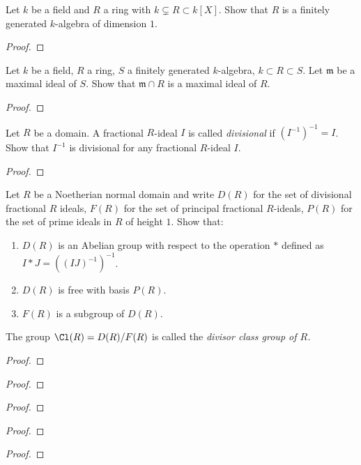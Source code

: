 \begin{problem}
Let $k$ be a field and $R$ a ring with $k\subsetneq R\subset k[X]$. Show
that $R$ is a finitely generated $k$-algebra of dimension $1$.
\end{problem}
\begin{proof}
\end{proof}
\newpage
\begin{problem}
Let $k$ be a field, $R$ a ring, $S$ a finitely generated $k$-algebra,
$k\subset R\subset S$. Let $\mathfrak{m}$ be a maximal ideal of $S$. Show
that $\mathfrak{m}\cap R$ is a maximal ideal of $R$.
\end{problem}
\begin{proof}
\end{proof}
\newpage
\begin{problem}
Let $R$ be a domain. A fractional $R$-ideal $I$ is called \emph{divisional}
if $(I^{-1})^{-1}=I$. Show that $I^{-1}$ is divisional for any fractional
$R$-ideal $I$.
\end{problem}
\begin{proof}
\end{proof}
\newpage
\begin{problem}
Let $R$ be a Noetherian normal domain and write $D(R)$ for the set of
divisional fractional $R$ ideals, $F(R)$ for the set of principal
fractional $R$-ideals, $P(R)$ for the set of prime ideals in $R$ of height
$1$. Show that:
\begin{enumerate}[label=(\alph*)]
\item $D(R)$ is an Abelian group with respect to the operation $*$ defined
  as $I*J=((IJ)^{-1})^{-1}$.
\item $D(R)$ is free with basis $P(R)$.
\item $F(R)$ is a subgroup of $D(R)$.
\end{enumerate}
The group $\Cl(R)=D(R)/F(R)$ is called the \emph{divisor class group of
  $R$.}
\end{problem}
\begin{proof}
\end{proof}
\newpage
\begin{problem}
\end{problem}
\begin{proof}
\end{proof}
\newpage
\begin{problem}
\end{problem}
\begin{proof}
\end{proof}
\newpage
\begin{problem}
\end{problem}
\begin{proof}
\end{proof}
\newpage
\begin{problem}
\end{problem}
\begin{proof}
\end{proof}

